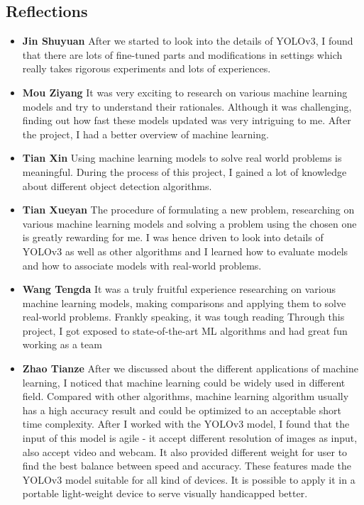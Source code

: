 \documentclass[letterpaper]{article} %
\begin{document}
\subsection{Reflections}
\begin{itemize}
    \item {\textbf{Jin Shuyuan}}
After we started to look into the details of YOLOv3, I found that there are lots of fine-tuned parts and modifications in settings which really takes rigorous experiments and lots of experiences.
\item{\textbf{Mou Ziyang}}
It was very exciting to research on various machine learning models and try to understand their rationales. Although it was challenging, finding out how fast these models updated was very intriguing to me. After the project, I had a better overview of machine learning.
\item{\textbf{Tian Xin}}
Using machine learning models to solve real world problems is meaningful. During the process of this project, I gained a lot of knowledge about different object detection algorithms.
\item{\textbf{Tian Xueyan}}
The procedure of formulating a new problem, researching on various machine learning models and solving a problem using the chosen one is greatly rewarding for me. I was hence driven to look into details of YOLOv3 as well as other algorithms and I learned how to evaluate models and how to associate models with real-world problems.
\item{\textbf{Wang Tengda}}
It was a truly fruitful experience researching on various machine learning models, making comparisons and applying them to solve real-world problems. Frankly speaking, it was tough reading Through this project, I got exposed to state-of-the-art ML algorithms and had great fun working as a team 
\item{\textbf{Zhao Tianze}}
After we discussed about the different applications of machine learning, I noticed that machine learning could be widely used in different field. Compared with other algorithms, machine learning algorithm usually has a high accuracy result and could be optimized to an acceptable short time complexity. After I worked with the YOLOv3 model, I found that the input of this model is agile - it accept different resolution of images as input, also accept video and webcam. It also provided different weight for user to find the best balance between speed and accuracy. These features made the YOLOv3 model suitable for all kind of devices. It is possible to apply it in a portable light-weight device to serve visually handicapped better.
\end{itemize}



\end{document}

